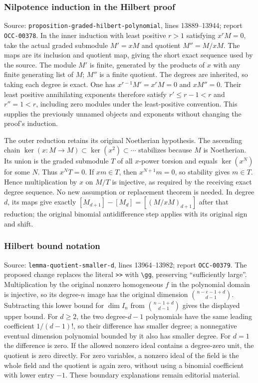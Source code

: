 \subsubsection{Nilpotence induction in the Hilbert proof}\label{algebra-proof-002-nilpotence-induction-in-the-hilbert-proof}

Source: \texttt{proposition-graded-hilbert-polynomial}, lines 13889--13944; report \texttt{OCC-00378}. In the inner induction with least positive \(r>1\) satisfying \(x^rM=0\), take the actual graded submodule \(M'=xM\) and quotient \(M''=M/xM\). The maps are its inclusion and quotient map, giving the short exact sequence used by the source. The module \(M'\) is finite, generated by the products of \(x\) with any finite generating list of \(M\); \(M''\) is a finite quotient. The degrees are inherited, so taking each degree is exact. One has \(x^{r-1}M'=x^rM=0\) and \(xM''=0\). Their least positive annihilating exponents therefore satisfy \(r'\leq r-1<r\) and \(r''=1<r\), including zero modules under the least-positive convention. This supplies the previously unnamed objects and exponents without changing the proof's induction.

The outer reduction retains its original Noetherian hypothesis. The ascending chain \(\ker(x:M\to M)\subset\ker(x^2)\subset\cdots\) stabilizes because \(M\) is Noetherian. Its union is the graded submodule \(T\) of all \(x\)-power torsion and equals \(\ker(x^N)\) for some \(N\). Thus \(x^NT=0\). If \(xm\in T\), then \(x^{N+1}m=0\), so stability gives \(m\in T\). Hence multiplication by \(x\) on \(M/T\) is injective, as required by the receiving exact degree sequence. No new assumption or replacement theorem is needed. In degree \(d\), its maps give exactly \([M_{d+1}]-[M_d]=[(M/xM)_{d+1}]\) after that reduction; the original binomial antidifference step applies with its original sign and shift.

\subsubsection{Hilbert bound notation}\label{algebra-proof-002-hilbert-bound-notation}

Source: \texttt{lemma-quotient-smaller-d}, lines 13964--13982; report \texttt{OCC-00379}. The proposed change replaces the literal \texttt{\textgreater{}\textgreater{}} with \texttt{\textbackslash{}gg}, preserving ``sufficiently large''. Multiplication by the original nonzero homogeneous \(f\) in the polynomial domain is injective, so its degree-\(n\) image has the original dimension \(\binom{n-e-1+d}{d-1}\). Subtracting this lower bound for \(\dim I_n\) from \(\binom{n-1+d}{d-1}\) gives the displayed upper bound. For \(d\geq2\), the two degree-\(d-1\) polynomials have the same leading coefficient \(1/(d-1)!\), so their difference has smaller degree; a nonnegative eventual dimension polynomial bounded by it also has smaller degree. For \(d=1\) the difference is zero. If the allowed nonzero ideal contains a degree-zero unit, the quotient is zero directly. For zero variables, a nonzero ideal of the field is the whole field and the quotient is again zero, without using a binomial coefficient with lower entry \(-1\). These boundary explanations remain editorial material.

